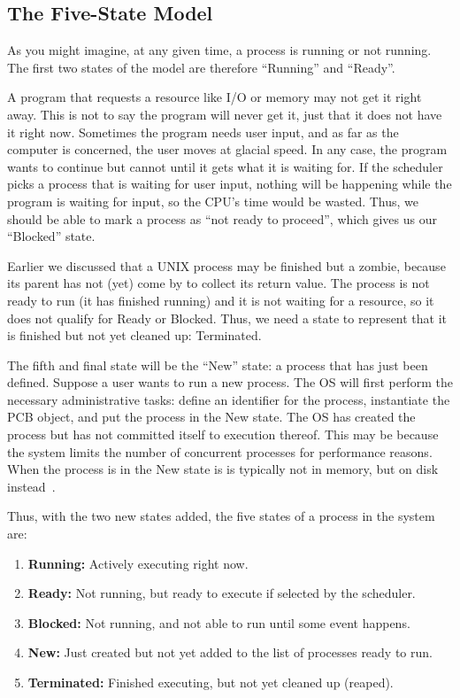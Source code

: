 \subsection*{The Five-State Model}

As you might imagine, at any given time, a process is running or not running. The first two states of the model are therefore ``Running'' and ``Ready''.

A program that requests a resource like I/O or memory may not get it right away. This is not to say the program will never get it, just that it does not have it right now. Sometimes the program needs user input, and as far as the computer is concerned, the user moves at glacial speed. In any case, the program wants to continue but cannot until it gets what it is waiting for.  If the scheduler picks a process that is waiting for user input, nothing will be happening while the program is waiting for input, so the CPU's time would be wasted. Thus, we should be able to mark a process as ``not ready to proceed'', which gives us our ``Blocked'' state.

Earlier we discussed that a UNIX process may be finished but a zombie, because its parent has not (yet) come by to collect its return value. The process is not ready to run (it has finished running) and it is not waiting for a resource, so it does not qualify for Ready or Blocked. Thus, we need a state to represent that it is finished but not yet cleaned up: Terminated.

The fifth and final state will be the ``New'' state: a process that has just been defined. Suppose a user wants to run a new process. The OS will first perform the necessary administrative tasks: define an identifier for the process, instantiate the PCB object, and put the process in the New state. The OS has created the process but has not committed itself to execution thereof. This may be because the system limits the number of concurrent processes for performance reasons. When the process is in the New state is is typically not in memory, but on disk instead~\cite{osi}.

Thus, with the two new states added, the five states of a process in the system are:

\begin{enumerate}
	\item \textbf{Running:} Actively executing right now.
	\item \textbf{Ready:} Not running, but ready to execute if selected by the scheduler.
	\item \textbf{Blocked:} Not running, and not able to run until some event happens.
	\item \textbf{New:} Just created but not yet added to the list of processes ready to run.
	\item \textbf{Terminated:} Finished executing, but not yet cleaned up (reaped).
\end{enumerate}


